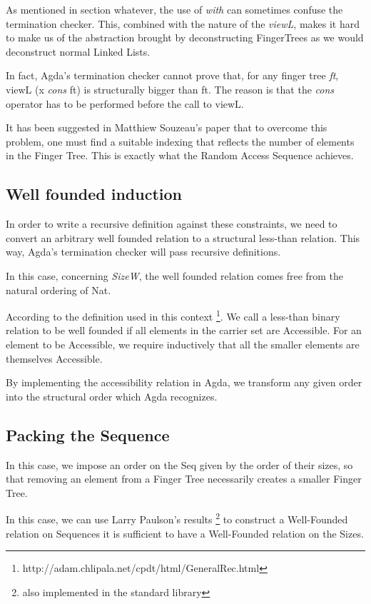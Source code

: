 \documentclass[12pt,twoside,notitlepage]{report}
\begin{document}
As mentioned in section whatever, the use of \textit{with} can sometimes confuse the termination checker. This, combined with the nature of the \textit{viewL}, makes it hard to make us of the abstraction brought by deconstructing FingerTrees as we would deconstruct normal Linked Lists.

In fact, Agda's termination checker cannot prove that, for any finger tree \textit{ft}, viewL (x \textit{cons} ft) is structurally bigger than ft. The reason is that the \textit{cons} operator has to be performed before the call to viewL.
 
It has been suggested in Matthiew Souzeau's paper \cite{coq} that to overcome this problem, one must find a suitable indexing that reflects the number of elements in the Finger Tree. This is exactly what the Random Access Sequence achieves.

\subsection{Well founded induction}

In order to write a recursive definition against these constraints, we need to convert an arbitrary well founded relation to a structural less-than relation. This way, Agda's termination checker will pass recursive definitions.

In this case, concerning \textit{SizeW}, the well founded relation comes free from the natural ordering of Nat. 

According to the definition used in this context \footnote{http://adam.chlipala.net/cpdt/html/GeneralRec.html}. We call a less-than binary relation to be well founded if all elements in the carrier set are Accessible. For an element to be Accessible, we require inductively that all the smaller elements are themselves Accessible.

By implementing the accessibility relation in Agda, we transform any given order into the structural order which Agda recognizes.

\subsection{Packing the Sequence}

In this case, we impose an order on the Seq given by the order of their sizes, so that removing an element from a Finger Tree necessarily creates a smaller Finger Tree.

In this case, we can use Larry Paulson's results \footnote{also implemented in the standard library} to construct a Well-Founded relation on Sequences it is sufficient to have a Well-Founded relation on the Sizes.
\end{document}
